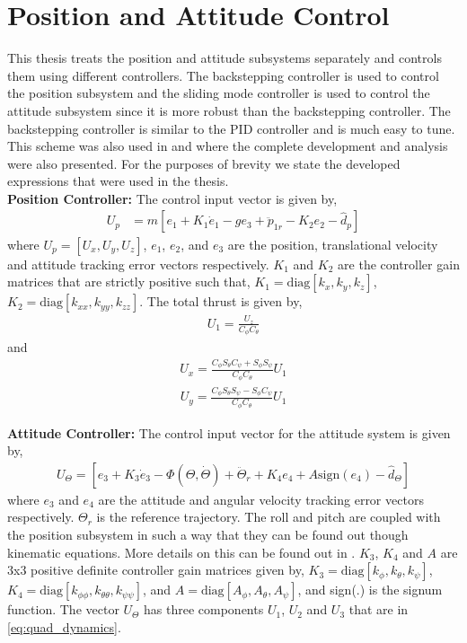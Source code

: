 \documentclass[letterpaper%
, twoside%
, 12pt%
,memoire%
, english%
,creativecommons,hyperref%
]{thETS}
\begin{document}
\section{Position and Attitude Control} \label{Sec:Control}
This thesis treats the position and attitude subsystems separately and controls them using different controllers. The backstepping controller is used to control the position subsystem and the sliding mode controller is used to control the attitude subsystem since it is more robust than the backstepping controller. The backstepping controller is similar to the PID controller and is much easy to tune. This scheme was also used in \citep{RN114} and \citep{RN117} where the complete development and analysis were also presented. For the purposes of brevity we state the developed expressions that were used in the thesis. \\
\textbf{Position Controller:} The control input vector is given by,
\begin{align}\label{eqn:posCon}
U_p&=m[e_1+K_1\dot{e}_1-ge_3+\ddot{p}_{1r}-K_2e_2-\hat{d}_p]
\end{align}
where $U_p=[U_x,U_y,U_z]$, $e_1$, $e_2$, and $e_3$ are the position, translational velocity and attitude tracking error vectors respectively. $K_1$ and $K_2$ are the controller gain matrices that are strictly positive such that, $K_1=\mbox{diag}[k_x,k_y,k_z]$, $K_2=\mbox{diag}[k_{xx},k_{yy},k_{zz}]$. The total thrust is given by,
\begin{align}
U_1=\frac{U_z}{C_\phi C_\theta} \label{eqn:posCon2}
\end{align}
and 
\begin{align}\label{eqn:posCon3}
U_x=\frac{C_\phi S_\theta C_\psi+S_\phi S_\psi}{C_\phi C_\theta}U_1
\end{align}
\begin{align}\label{eqn:posCon4}
U_y=\frac{C_\phi S_\theta S_\psi-S_\phi C_\psi}{C_\phi C_\theta}U_1
\end{align}



\textbf{Attitude Controller:}
The control input vector for the attitude system is given by,
\begin{align}\label{eqn:attCon}
U_\Theta=[e_3+K_3\dot{e}_3-\Phi(\Theta,\dot{\Theta})+\ddot{\Theta}_{r}+K_4e_4+A \text{sign}(e_4)- \hat{d}_\Theta]
\end{align}
where $e_3$ and $e_4$ are the attitude and angular velocity tracking error vectors respectively. $\Theta_r$ is the reference trajectory. The roll and pitch are coupled with the position subsystem in such a way that they can be found out though kinematic equations. More details on this can be found out in \citep{RN114}. $K_3$, $K_4$ and $A$ are 3x3 positive definite controller gain matrices given by, $K_3=\mbox{diag}[k_{\phi},k_{\theta},k_{\psi}]$, $K_4=\mbox{diag}[k_{\phi \phi},k_{\theta \theta},k_{\psi \psi}]$, and $A=\mbox{diag}[A_\phi,A_\theta,A_\psi]$, and sign(.) is the signum function. The vector $U_\Theta$ has three components $U_1$, $U_2$ and $U_3$ that are in \eqref{eq:quad_dynamics}.
\end{document}
